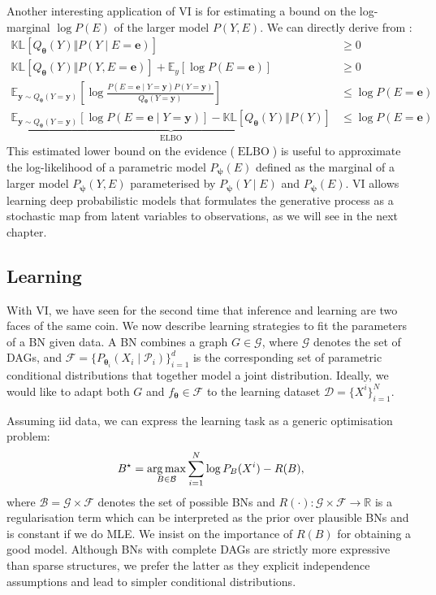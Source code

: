 Another interesting application of VI is for estimating a bound on the log-marginal $\log P(E)$ of the larger model $P(Y, E)$. We can directly derive from :
\begin{align}
  \mathbb{KL}\left[Q_{\bm{\theta}}(Y)\Vert P(Y\mid E=\bm{e})\right] &\geq 0\\
  \mathbb{KL}\left[Q_{\bm{\theta}}(Y)\Vert P(Y, E=\bm{e}) \right] + \mathbb{E}_{y}\left[\log P(E=\bm{e})\right] &\geq 0\\
  \mathbb{E}_{\bm y \sim Q_{\bm{\theta}}(Y=\bm{y})}\left[ \log \frac{P(E=\bm{e}\mid Y=\bm{y}) P(Y=\bm{y})}{Q_{\bm{\theta}}(Y=\bm{y})} \right] &\leq \log P(E=\bm{e})\\
  \underbrace{\mathbb{E}_{\bm y \sim Q_{\bm{\theta}}(Y=\bm{y})}\left[ \log P(E=\bm{e}\mid Y=\bm{y})\right] - \mathbb{KL}\left[Q_{\bm{\theta}}(Y)\Vert P(Y)\right]}_{\operatorname{ELBO}} &\leq \log P(E=\bm{e}) \label{eq:elbo}
\end{align}
This estimated lower bound on the evidence ($\operatorname{ELBO}$) is useful to approximate the log-likelihood of a parametric model $P_{\bm \psi}(E)$ defined as the marginal of a larger model $P_{\bm \psi}(Y, E)$ parameterised by $P_{\bm \psi}(Y \mid E)$ and $P_{\bm \psi}(E)$.
VI allows learning deep probabilistic models that formulates the generative process as a stochastic map from latent variables to observations, as we will see in the next chapter.
\subsection{Learning}
With VI, we have seen for the second time that inference and learning are two faces of the same coin. We now describe learning strategies to fit the parameters of a BN given data.
A BN combines a graph $G \in \mathcal{G}$, where $\mathcal{G}$ denotes the set of DAGs, and $\mathcal{F} = \{P_{\bm{\theta}_i}(X_i\mid \mathcal{P}_i)\}_{i=1}^d$ is the corresponding set of parametric conditional distributions that together model a joint distribution. Ideally, we would like to adapt both $G$ and $f_{\bm{\theta}} \in \mathcal{F}$ to the learning dataset $\mathcal{D}=\{X^i\}_{i=1}^N$.

Assuming iid data, we can express the learning task as a generic optimisation problem:
\begin{align}
  B^\star  = \operatorname*{arg\,max}_{B\in\mathcal{B}} \sum_{i=1}^N \log P_B(X^i) - R(B), \label{eq:learn_BN}
\end{align}
where $\mathcal{B} = \mathcal{G} \times \mathcal{F}$ denotes the set of possible BNs and $R(\cdot): \mathcal{G} \times \mathcal{F} \rightarrow \mathbb{R}$ is a regularisation term which can be interpreted as the prior over plausible BNs and is constant if we do MLE. We insist on the importance of $R(B)$ for obtaining a good model. Although BNs with complete DAGs are strictly more expressive than sparse structures, we prefer the latter as they explicit independence assumptions and lead to simpler conditional distributions.

